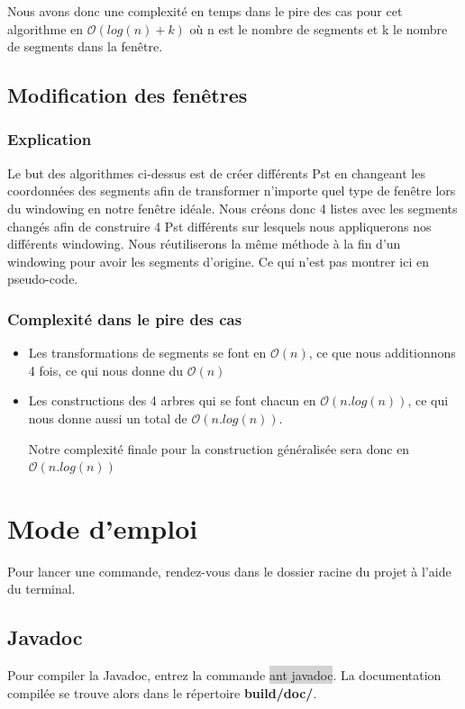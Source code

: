 \documentclass[10pt,a4paper]{article}
\begin{document}
Nous avons donc une complexité en temps dans le pire des cas pour cet algorithme en $\mathcal{O}(log(n)+k)$ où n est le nombre de segments et k le nombre de segments dans la fenêtre.

\subsection{Modification des fenêtres}


\subsubsection{Explication}
Le but des algorithmes ci-dessus est de créer différents Pst en changeant les coordonnées des segments afin de transformer n'importe quel type de fenêtre lors du windowing en notre fenêtre idéale. 
Nous créons donc 4 listes avec les segments changés afin de construire 4 Pst différents sur lesquels nous appliquerons nos différents windowing. Nous réutiliserons la même méthode à la fin d'un windowing pour avoir les segments d'origine. Ce qui n'est pas montrer ici en pseudo-code.

\subsubsection{Complexité dans le pire des cas}
\begin{itemize}
\item Les transformations de segments se font en $\mathcal{O}(n)$, ce que nous additionnons 4 fois, ce qui nous donne du $\mathcal{O}(n)$

\item Les constructions des 4 arbres qui se font chacun en $\mathcal{O}(n.log(n))$, ce qui nous donne aussi un total de $\mathcal{O}(n.log(n))$.

Notre complexité finale pour la construction généralisée sera donc en $\mathcal{O}(n.log(n))$
 \end{itemize}
\newpage
\section{Mode d'emploi}
Pour lancer une commande, rendez-vous dans le dossier racine du projet à l'aide du terminal.

\subsection{Javadoc}
Pour compiler la Javadoc, entrez la commande \colorbox{lightgray}{ant javadoc}. La documentation compilée se trouve alors dans le répertoire \textbf{build/doc/}.
\end{document}

